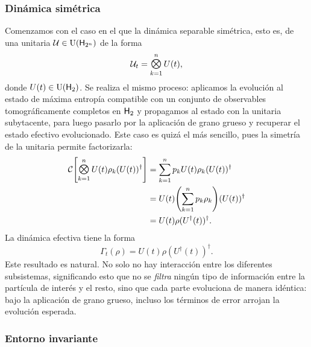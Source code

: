\subsubsection{Dinámica simétrica}

Comenzamos con el caso en el que la dinámica separable simétrica, esto es, de una unitaria $\mathcal{U}\in\text{U}({\sf H}_{2^{n}})$ de la forma
\begin{equation*}
    \mcU_{t}=\Motimes_{k=1}^{n}U(t),
\end{equation*}
donde $U(t)\in\text{U}({\sf H}_{2})$. Se realiza el mismo proceso: aplicamos la evolución al estado de máxima entropía compatible con un conjunto de observables tomográficamente completos en ${\sf H}_{2}$ y propagamos al estado con la unitaria subytacente, para luego pasarlo por la aplicación de grano grueso y recuperar el estado efectivo evolucionado. Este caso es quizá el más sencillo, pues la simetría de la unitaria permite factorizarla:
\begin{align*}
\mcC\qty[\Motimes_{k=1}^{n}U(t) \rho_{k} (U(t))^{\dag}]&=\sum_{k=1}^{n}p_{k} U(t) \rho_{k} (U(t))^{\dag} \\
&=U(t)\qty(\sum_{k=1}^{n}p_{k} \rho_{k}) (U(t))^{\dag}\\
&=U(t)\rho(U^{\dag}(t))^{\dag}.
\end{align*}
La dinámica efectiva tiene la forma
\begin{equation}
    \Gamma_{t}(\rho)=U(t)\rho(U^{\dag}(t))^{\dag}.
\end{equation}
Este resultado es natural. No solo no hay interacción entre los diferentes subsistemas, significando esto que no se \textit{filtra} ningún tipo de información entre la partícula de interés y el resto, sino que cada parte evoluciona de manera idéntica: bajo la aplicación de grano grueso, incluso los términos de error arrojan la evolución esperada.

\subsubsection{Entorno invariante}

